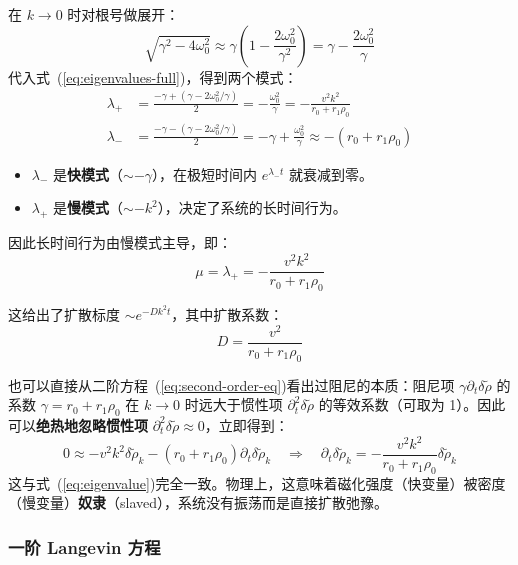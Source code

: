 \begin{derivation}
在 $k \to 0$ 时对根号做展开：
\[
\sqrt{\gamma^2 - 4\omega_0^2} \approx \gamma\left(1 - \frac{2\omega_0^2}{\gamma^2}\right) = \gamma - \frac{2\omega_0^2}{\gamma}
\]
代入式~(\ref{eq:eigenvalues-full})，得到两个模式：
\begin{align}
    \lambda_+ &= \frac{-\gamma + (\gamma - 2\omega_0^2/\gamma)}{2} = -\frac{\omega_0^2}{\gamma} = -\frac{v^2 k^2}{r_0 + r_1\rho_0} \label{eq:slow-mode}\\
    \lambda_- &= \frac{-\gamma - (\gamma - 2\omega_0^2/\gamma)}{2} = -\gamma + \frac{\omega_0^2}{\gamma} \approx -(r_0 + r_1\rho_0) \label{eq:fast-mode}
\end{align}

\begin{itemize}
    \item $\lambda_-$ 是\textbf{快模式}（$\sim -\gamma$），在极短时间内 $e^{\lambda_- t}$ 就衰减到零。
    \item $\lambda_+$ 是\textbf{慢模式}（$\sim -k^2$），决定了系统的长时间行为。
\end{itemize}

因此长时间行为由慢模式主导，即：
\begin{equation}\label{eq:eigenvalue}
\boxed{\mu = \lambda_+ = -\frac{v^2 k^2}{r_0 + r_1\rho_0}}
\end{equation}
\end{derivation}

这给出了扩散标度 $\sim e^{-Dk^2t}$，其中扩散系数：
\begin{equation}\label{eq:diffusivity}
\boxed{D = \frac{v^2}{r_0 + r_1\rho_0}}
\end{equation}

\begin{remark}[过阻尼的另一种直观理解]
也可以直接从二阶方程~(\ref{eq:second-order-eq})看出过阻尼的本质：阻尼项 $\gamma\partial_t\delta\tilde{\rho}$ 的系数 $\gamma = r_0 + r_1\rho_0$ 在 $k \to 0$ 时远大于惯性项 $\partial_t^2\delta\tilde{\rho}$ 的等效系数（可取为 1）。因此可以\textbf{绝热地忽略惯性项} $\partial_t^2\delta\tilde{\rho} \approx 0$，立即得到：
\[
0 \approx -v^2 k^2 \delta\tilde{\rho}_k - (r_0 + r_1\rho_0)\partial_t\delta\tilde{\rho}_k
\quad\Longrightarrow\quad
\partial_t\delta\tilde{\rho}_k = -\frac{v^2 k^2}{r_0 + r_1\rho_0}\delta\tilde{\rho}_k
\]
这与式~(\ref{eq:eigenvalue})完全一致。物理上，这意味着磁化强度（快变量）被密度（慢变量）\textbf{奴隶}（slaved），系统没有振荡而是直接扩散弛豫。
\end{remark}

\subsubsection{一阶 Langevin 方程}

